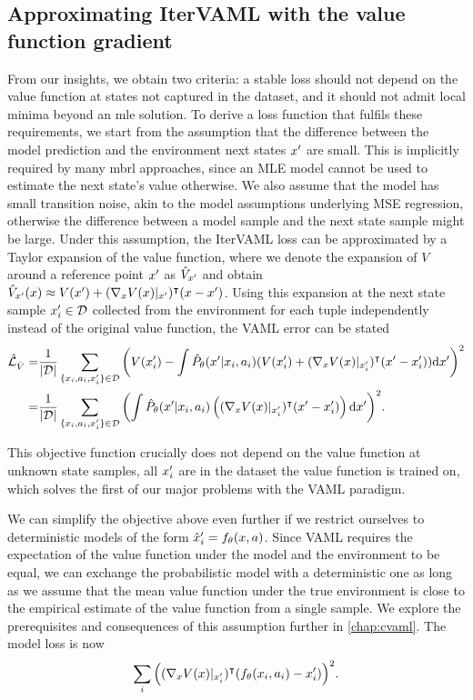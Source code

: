 \subsection{Approximating IterVAML with the value function gradient}
From our insights, we obtain two criteria: a stable loss should not depend on the value function at states not captured in the dataset, and it should not admit local minima beyond an \ac{mle} solution.
To derive a loss function that fulfils these requirements, we start from the assumption that the difference between the model prediction and the environment next states $x'$ are small.
This is implicitly required by many \ac{mbrl} approaches, since an MLE model cannot be used to estimate the next state's value otherwise. 
{We also assume that the model has small transition noise, akin to the model assumptions underlying MSE regression, otherwise the difference between a model sample and the next state sample might be large.}
Under this assumption, the IterVAML loss can be approximated by a Taylor expansion of the value function, where we denote the expansion of $V$ around a reference point $x'$ as $\hat{V}_{x'}$ and obtain $\hat{V}_{x'}(x) \approx V(x') + (\nabla_x V(x)|_{x'})^\intercal (x - x')$.
Using this expansion at the next state sample $x'_i \in \mathcal{D}$ collected from the environment for each tuple independently instead of the original value function, the VAML error can be stated
\begin{align}
    \hat{\mathcal{L}}_{\hat{V}}=&\frac{1}{|\mathcal{D}|}\sum_{\{x_i,a_i,x'_i\}\in\mathcal{D}}{\left(V(x'_i) - \int \hat{P}_\theta(x'|x_i,a_i) (V(x'_i) + (\nabla_x V(x)|_{x'_i})^\intercal (x' - x'_i)) \mathrm{d}x'\right)^2}\\
    =&\frac{1}{|\mathcal{D}|}\sum_{\{x_i,a_i,x'_i\}\in\mathcal{D}} {\left(\int \hat{P}_\theta(x'|x_i,a_i) \left((\nabla_x V(x)|_{x'_i})^\intercal(x' - x'_i) \right) \mathrm{d}x'\right)^2}.
\end{align}

This objective function crucially does not depend on the value function {at unknown state samples, all $x'_i$ are in the dataset the value function is trained on}, which solves the first of our major problems with the VAML paradigm.

We can simplify the objective above even further if we restrict ourselves to deterministic models of the form $\hat{x}'_i = f_\theta(x,a)$.
Since VAML requires the expectation of the value function under the model and the environment to be equal, we can exchange the probabilistic model with a deterministic one as long as we assume that the mean value function under the true environment is close to the empirical estimate of the value function from a single sample.
We explore the prerequisites and consequences of this assumption further in \autoref{chap:cvaml}.
The model loss is now
\begin{align}
    \sum_i {\left((\nabla_x V(x)|_{x'_i})^\intercal (f_\theta(x_i,a_i) - x'_i) \right)^2} \label{eq:vagram:taylor_vaml}.
\end{align}

